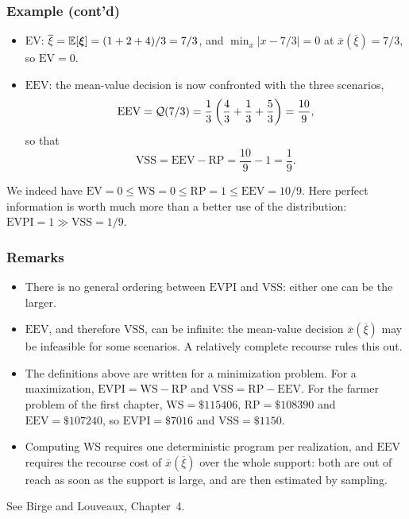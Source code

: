 \documentclass[aspectratio=169]{beamer}
\newcommand{\WS}{\mathrm{WS}}
\newcommand{\RP}{\mathrm{RP}}
\newcommand{\EV}{\mathrm{EV}}
\newcommand{\EEV}{\mathrm{EEV}}
\newcommand{\EVPI}{\mathrm{EVPI}}
\newcommand{\VSS}{\mathrm{VSS}}
\begin{document}
\begin{frame}
\frametitle{Example (cont'd)}

\begin{itemize}
\item
{\blue $\EV$}: $\overline{\xi} = {\mathbb{E}}[{\boldsymbol{\xi}}] = (1+2+4)/3 = 7/3$, and $\min_x |x-7/3| = 0$ at $\overline{x}(\overline{\xi}) = 7/3$, so $\EV = 0$.
\item
{\blue $\EEV$}: the mean-value decision is now confronted with the three scenarios,
\[
\EEV = \calQ(7/3) = \frac{1}{3}\left( \frac{4}{3}+\frac{1}{3}+\frac{5}{3} \right) = \frac{10}{9},
\]
so that
\[
\VSS = \EEV - \RP = \frac{10}{9}-1 = \frac{1}{9}.
\]
\end{itemize}
We indeed have $\EV = 0 \leq \WS = 0 \leq \RP = 1 \leq \EEV = 10/9$.
Here perfect information is worth much more than a better use of the distribution: $\EVPI = 1 \gg \VSS = 1/9$.

\end{frame}

\begin{frame}
\frametitle{Remarks}

\begin{itemize}
\item
There is no general ordering between $\EVPI$ and $\VSS$: either one can be the larger.
\item
$\EEV$, and therefore $\VSS$, can be infinite: the mean-value decision $\overline{x}(\overline{\xi})$ may be infeasible for some scenarios.
A relatively complete recourse rules this out.
\item
The definitions above are written for a minimization problem.
For a maximization, $\EVPI = \WS - \RP$ and $\VSS = \RP - \EEV$.
For the farmer problem of the first chapter, $\WS = \$115406$, $\RP = \$108390$ and $\EEV = \$107240$, so $\EVPI = \$7016$ and $\VSS = \$1150$.
\item
Computing $\WS$ requires one deterministic program per realization, and $\EEV$ requires the recourse cost of $\overline{x}(\overline{\xi})$ over the whole support: both are out of reach as soon as the support is large, and are then estimated by sampling.
\end{itemize}

See Birge and Louveaux, Chapter~4.

\end{frame}
\end{document}
